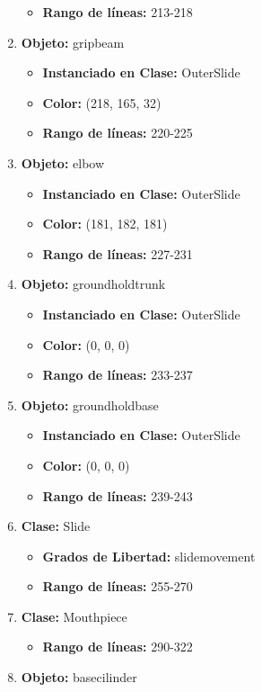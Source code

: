 \documentclass[10pt, a4paper]{article}
\begin{document}
\begin{enumerate}
\begin{itemize}
		\item \textbf{Rango de líneas:} 213-218
	\end{itemize}
	\item \textbf{Objeto:} gripbeam 
	\begin{itemize}
		\item \textbf{Instanciado en Clase:} OuterSlide
		\item \textbf{Color:} (218, 165, 32)
		\item \textbf{Rango de líneas:} 220-225
	\end{itemize}
	\item \textbf{Objeto:} elbow
	\begin{itemize}
		\item \textbf{Instanciado en Clase:} OuterSlide
		\item \textbf{Color:} (181, 182, 181)
		\item \textbf{Rango de líneas:} 227-231
	\end{itemize}
	\item \textbf{Objeto:} groundholdtrunk
	\begin{itemize}
		\item \textbf{Instanciado en Clase:} OuterSlide
		\item \textbf{Color:} (0, 0, 0)
		\item \textbf{Rango de líneas:} 233-237
	\end{itemize}
	\item \textbf{Objeto:} groundholdbase 
	\begin{itemize}
		\item \textbf{Instanciado en Clase:} OuterSlide
		\item \textbf{Color:} (0, 0, 0)
		\item \textbf{Rango de líneas:} 239-243
	\end{itemize}
	\item \textbf{Clase:} Slide
	\begin{itemize}
		\item \textbf{Grados de Libertad:} slidemovement
		\item \textbf{Rango de líneas:} 255-270
	\end{itemize}
	\item \textbf{Clase:} Mouthpiece
	\begin{itemize}
		\item \textbf{Rango de líneas:} 290-322
	\end{itemize}
	\item \textbf{Objeto:} basecilinder 
	\begin{itemize}

\end{itemize}
\end{enumerate}
\end{document}
